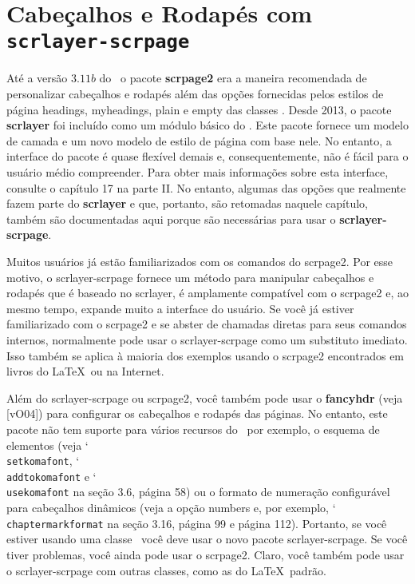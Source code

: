 \chapter{Cabeçalhos e Rodapés com \texttt{scrlayer-scrpage}}

Até a versão $3.11b$ do \KOMAScript\ o pacote \textbf{scrpage2} era a maneira recomendada de personalizar cabeçalhos e rodapés além das opções fornecidas pelos estilos de página headings, myheadings, plain e empty das classes \KOMAScript. Desde 2013, o pacote \textbf{scrlayer} foi incluído como um módulo básico do \KOMAScript. Este pacote fornece um modelo de camada e um novo modelo de estilo de página com base nele. No entanto, a interface do pacote é quase flexível demais e, consequentemente, não é fácil para o usuário médio compreender. Para obter mais informações sobre esta interface, consulte o capítulo 17 na parte II. No entanto, algumas das opções que realmente fazem parte do \textbf{scrlayer} e que, portanto, são retomadas naquele capítulo, também são documentadas aqui porque são necessárias para usar o \textbf{scrlayer-scrpage}.

Muitos usuários já estão familiarizados com os comandos do scrpage2. Por esse motivo, o scrlayer-scrpage fornece um método para manipular cabeçalhos e rodapés que é baseado no scrlayer, é amplamente compatível com o scrpage2 e, ao mesmo tempo, expande muito a interface do usuário. Se você já estiver familiarizado com o scrpage2 e se abster de chamadas diretas para seus comandos internos, normalmente pode usar o scrlayer-scrpage como um substituto imediato. Isso também se aplica à maioria dos exemplos usando o scrpage2 encontrados em livros do \LaTeX\ ou na Internet.

Além do scrlayer-scrpage ou scrpage2, você também pode usar o \textbf{fancyhdr} (veja [vO04]) para configurar os cabeçalhos e rodapés das páginas. No entanto, este pacote não tem suporte para vários recursos do \KOMAScript\ por exemplo, o esquema de elementos (veja \char`\\\texttt{set\-ko\-ma\-font}, \char`\\\texttt{add\-to\-ko\-ma\-font} e \char`\\\texttt{use\-ko\-ma\-font} na seção 3.6, página 58) ou o formato de numeração configurável para cabeçalhos dinâmicos (veja a opção numbers e, por exemplo, \char`\\\texttt{chap\-ter\-mark\-for\-mat} na seção 3.16, página 99 e página 112). Portanto, se você estiver usando uma classe \KOMAScript\ você deve usar o novo pacote scrlayer-scrpage. Se você tiver problemas, você ainda pode usar o scrpage2. Claro, você também pode usar o scrlayer-scrpage com outras classes, como as do \LaTeX\ padrão.

